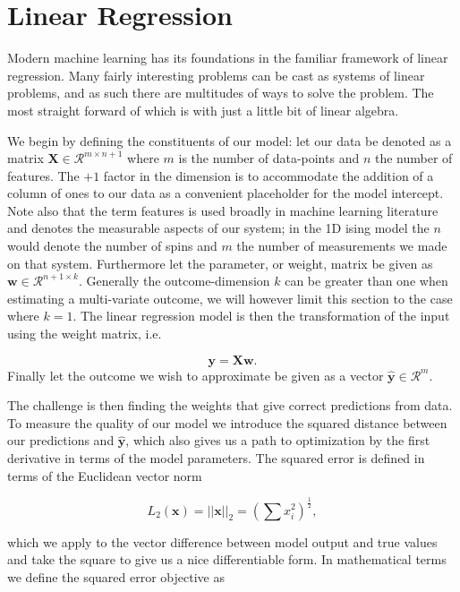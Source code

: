 
\section{Linear Regression}\label{sec:LinReg}

Modern machine learning has its foundations in the familiar framework of linear regression. Many fairly interesting problems can be cast as systems of linear problems, and as such there are multitudes of ways to solve the problem. The most straight forward of which is with just a little bit of linear algebra.

We begin by defining the constituents of our model: let our data be denoted as a matrix $\mathbf{X} \in \mathcal{R}^{m\times n+1}$ where $m$ is the number of data-points and $n$ the number of features. The $+1$ factor in the dimension is to accommodate the addition of a column of ones to our data as a convenient placeholder for the model intercept. Note also that the term features is used broadly in machine learning literature and denotes the measurable aspects of our system; in the 1D ising model the $n$ would denote the number of spins and $m$ the number of measurements we made on that system. Furthermore let the parameter, or weight, matrix be given as $\mathbf{w} \in \mathcal{R}^{n + 1\times k}$. Generally the outcome-dimension $k$ can be greater than one when estimating a multi-variate outcome, we will however limit this section to the case where $k=1$. The linear regression model is then the transformation of the input using the weight matrix, i.e. 

\begin{equation}\label{eq:og_linreg}
\mathbf{y} = \mathbf{X}\mathbf{w}.
\end{equation}
\noindent Finally let the outcome we wish to approximate be given as a vector $\mathbf{\hat{y}} \in \mathcal{R}^m$. 

The challenge is then finding the weights that give correct predictions from data. To measure the quality of our model we introduce the squared distance between our predictions and $\mathbf{\hat{y}}$, which also gives us a path to optimization by the first derivative in terms of the model parameters. The squared error is defined in terms of the Euclidean vector norm  

$$L_2(\mathbf{x}) =||\mathbf{x}||_2 = \left(\sum x_i^2\right)^{\frac{1}{2}},$$

\noindent which we apply to the vector difference between model output and true values and take the square to give us a nice differentiable form. In mathematical terms we define the squared error objective as

